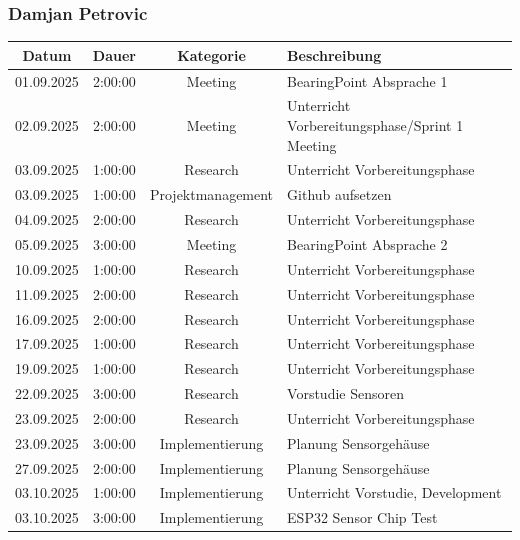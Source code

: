 \documentclass{article}
\begin{document}
\subsubsection*{Damjan Petrovic}
\begin{table}[H]
  \centering
  \begin{tabularx}{\textwidth}{|c|c|c|X|}
    \hline
    \rowcolor{black!10}\textbf{Datum} & \textbf{Dauer} & \textbf{Kategorie} & \textbf{Beschreibung} \\
    \hline
    01.09.2025 & 2:00:00 & Meeting           & BearingPoint Absprache 1 \\ \hline
    02.09.2025 & 2:00:00 & Meeting           & Unterricht Vorbereitungsphase/Sprint 1 Meeting \\ \hline
    03.09.2025 & 1:00:00 & Research          & Unterricht Vorbereitungsphase \\ \hline
    03.09.2025 & 1:00:00 & Projektmanagement & Github aufsetzen \\ \hline
    04.09.2025 & 2:00:00 & Research          & Unterricht Vorbereitungsphase \\ \hline
    05.09.2025 & 3:00:00 & Meeting           & BearingPoint Absprache 2 \\ \hline
    10.09.2025 & 1:00:00 & Research          & Unterricht Vorbereitungsphase \\ \hline
    11.09.2025 & 2:00:00 & Research          & Unterricht Vorbereitungsphase \\ \hline
    16.09.2025 & 2:00:00 & Research          & Unterricht Vorbereitungsphase \\ \hline
    17.09.2025 & 1:00:00 & Research          & Unterricht Vorbereitungsphase \\ \hline
    19.09.2025 & 1:00:00 & Research          & Unterricht Vorbereitungsphase \\ \hline
    22.09.2025 & 3:00:00 & Research          & Vorstudie Sensoren \\ \hline
    23.09.2025 & 2:00:00 & Research          & Unterricht Vorbereitungsphase \\ \hline
    23.09.2025 & 3:00:00 & Implementierung   & Planung Sensorgehäuse \\ \hline
    27.09.2025 & 2:00:00 & Implementierung   & Planung Sensorgehäuse \\ \hline
    03.10.2025 & 1:00:00 & Implementierung   & Unterricht Vorstudie, Development \\ \hline
    03.10.2025 & 3:00:00 & Implementierung   & ESP32 Sensor Chip Test \\ \hline

\end{tabularx}
\end{table}
\end{document}
